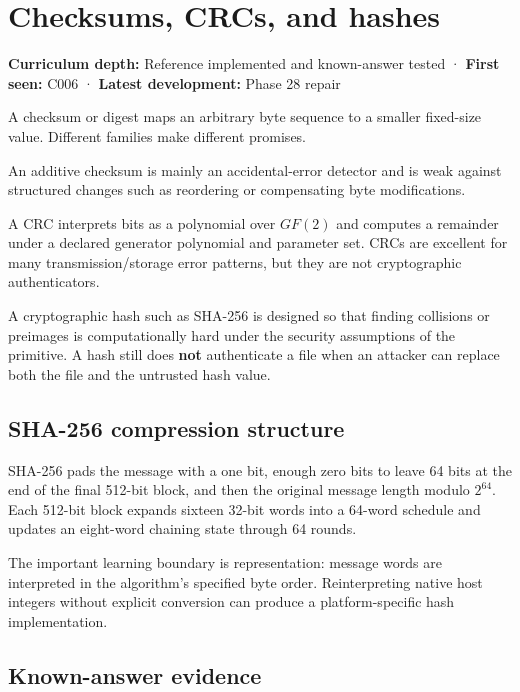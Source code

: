 \hypertarget{appendix-ed338677de0a}{}\label{referencestart:appendix-ed338677de0a}
\section{Checksums, CRCs, and hashes}\label{appendix-ed338677de0a-checksums-crcs-and-hashes}

\textbf{Curriculum depth:} Reference implemented and known-answer tested · \textbf{First seen:} C006 · \textbf{Latest development:} Phase 28 repair

A checksum or digest maps an arbitrary byte sequence to a smaller fixed-size value. Different families make different promises.

An additive checksum is mainly an accidental-error detector and is weak against structured changes such as reordering or compensating byte modifications.

A CRC interprets bits as a polynomial over \(GF(2)\) and computes a remainder under a declared generator polynomial and parameter set. CRCs are excellent for many transmission/storage error patterns, but they are not cryptographic authenticators.

A cryptographic hash such as SHA-256 is designed so that finding collisions or preimages is computationally hard under the security assumptions of the primitive. A hash still does \textbf{not} authenticate a file when an attacker can replace both the file and the untrusted hash value.

\subsection{SHA-256 compression structure}\label{appendix-ed338677de0a-sha-256-compression-structure}

SHA-256 pads the message with a one bit, enough zero bits to leave 64 bits at the end of the final 512-bit block, and then the original message length modulo \(2^{64}\). Each 512-bit block expands sixteen 32-bit words into a 64-word schedule and updates an eight-word chaining state through 64 rounds.

The important learning boundary is representation: message words are interpreted in the algorithm's specified byte order. Reinterpreting native host integers without explicit conversion can produce a platform-specific hash implementation.

\subsection{Known-answer evidence}\label{appendix-ed338677de0a-known-answer-evidence}

